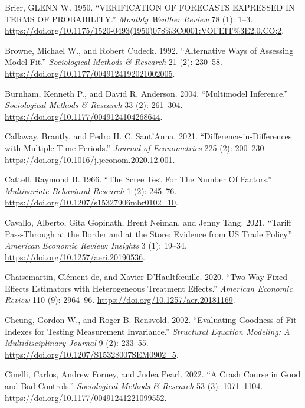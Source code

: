 \documentclass[
  letterpaper,
  10pt,
  twoside,
  openright,
  numbers=noenddot,
  chapterprefix=true]{scrbook}
\newlength{\cslhangindent}
\newenvironment{CSLReferences}[2] %
 {\begin{list}{}{%
  \setlength{\itemindent}{0pt}
  \setlength{\leftmargin}{0pt}
  \setlength{\parsep}{0pt}
  \ifodd #1
   \setlength{\leftmargin}{\cslhangindent}
   \setlength{\itemindent}{-1\cslhangindent}
  \fi
  \setlength{\itemsep}{#2\baselineskip}}}
 {\end{list}}
\begin{document}
\begin{CSLReferences}{1}{0}
Brier, GLENN W. 1950. {``{VERIFICATION} {OF} {FORECASTS} {EXPRESSED}
{IN} {TERMS} {OF} {PROBABILITY}.''} \emph{{Monthly} {Weather} {Review}}
78 (1): 1--3.
\url{https://doi.org/10.1175/1520-0493(1950)078\%3C0001:VOFEIT\%3E2.0.CO;2}.

Browne, Michael W., and Robert Cudeck. 1992. {``{Alternative} {Ways} of
{Assessing} {Model} {Fit}.''} \emph{{Sociological} {Methods} \&
{Research}} 21 (2): 230--58.
\url{https://doi.org/10.1177/0049124192021002005}.

Burnham, Kenneth P., and David R. Anderson. 2004. {``{Multimodel}
{Inference}.''} \emph{{Sociological} {Methods} \& {Research}} 33 (2):
261--304. \url{https://doi.org/10.1177/0049124104268644}.

Callaway, Brantly, and Pedro H. C. Sant'Anna. 2021.
{``{Difference}-in-{Differences} with Multiple Time Periods.''}
\emph{{Journal} of {Econometrics}} 225 (2): 200--230.
\url{https://doi.org/10.1016/j.jeconom.2020.12.001}.

Cattell, Raymond B. 1966. {``{The} {Scree} {Test} {For} {The} {Number}
{Of} {Factors}.''} \emph{{Multivariate} {Behavioral} {Research}} 1 (2):
245--76. \url{https://doi.org/10.1207/s15327906mbr0102_10}.

Cavallo, Alberto, Gita Gopinath, Brent Neiman, and Jenny Tang. 2021.
{``{Tariff} {Pass}-{Through} at the {Border} and at the {Store}:
{Evidence} from {US} {Trade} {Policy}.''} \emph{{American} {Economic}
{Review}: {Insights}} 3 (1): 19--34.
\url{https://doi.org/10.1257/aeri.20190536}.

Chaisemartin, Clément de, and Xavier D'Haultfœuille. 2020.
{``{Two}-{Way} {Fixed} {Effects} {Estimators} with {Heterogeneous}
{Treatment} {Effects}.''} \emph{{American} {Economic} {Review}} 110 (9):
2964--96. \url{https://doi.org/10.1257/aer.20181169}.

Cheung, Gordon W., and Roger B. Rensvold. 2002. {``{Evaluating}
{Goodness}-of-{Fit} {Indexes} for {Testing} {Measurement}
{Invariance}.''} \emph{{Structural} {Equation} {Modeling}: A
{Multidisciplinary} {Journal}} 9 (2): 233--55.
\url{https://doi.org/10.1207/S15328007SEM0902_5}.

Cinelli, Carlos, Andrew Forney, and Judea Pearl. 2022. {``A {Crash}
{Course} in {Good} and {Bad} {Controls}.''} \emph{{Sociological}
{Methods} \& {Research}} 53 (3): 1071--1104.
\url{https://doi.org/10.1177/00491241221099552}.


\end{CSLReferences}
\end{document}
